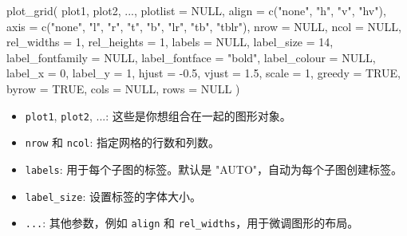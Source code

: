 \documentclass[
]{article}
\newenvironment{Shaded}{}{}
\newcommand{\AttributeTok}[1]{\textcolor[rgb]{0.49,0.56,0.16}{#1}}
\newcommand{\ConstantTok}[1]{\textcolor[rgb]{0.53,0.00,0.00}{#1}}
\newcommand{\DecValTok}[1]{\textcolor[rgb]{0.25,0.63,0.44}{#1}}
\newcommand{\FloatTok}[1]{\textcolor[rgb]{0.25,0.63,0.44}{#1}}
\newcommand{\FunctionTok}[1]{\textcolor[rgb]{0.02,0.16,0.49}{#1}}
\newcommand{\NormalTok}[1]{#1}
\newcommand{\SpecialCharTok}[1]{\textcolor[rgb]{0.25,0.44,0.63}{#1}}
\newcommand{\StringTok}[1]{\textcolor[rgb]{0.25,0.44,0.63}{#1}}
\begin{document}
\begin{Shaded}
\begin{Highlighting}[]
\FunctionTok{plot\_grid}\NormalTok{(}
\NormalTok{  plot1, plot2,}
\NormalTok{  ...,}
  \AttributeTok{plotlist =} \ConstantTok{NULL}\NormalTok{,}
  \AttributeTok{align =} \FunctionTok{c}\NormalTok{(}\StringTok{"none"}\NormalTok{, }\StringTok{"h"}\NormalTok{, }\StringTok{"v"}\NormalTok{, }\StringTok{"hv"}\NormalTok{),}
  \AttributeTok{axis =} \FunctionTok{c}\NormalTok{(}\StringTok{"none"}\NormalTok{, }\StringTok{"l"}\NormalTok{, }\StringTok{"r"}\NormalTok{, }\StringTok{"t"}\NormalTok{, }\StringTok{"b"}\NormalTok{, }\StringTok{"lr"}\NormalTok{, }\StringTok{"tb"}\NormalTok{, }\StringTok{"tblr"}\NormalTok{),}
  \AttributeTok{nrow =} \ConstantTok{NULL}\NormalTok{,}
  \AttributeTok{ncol =} \ConstantTok{NULL}\NormalTok{,}
  \AttributeTok{rel\_widths =} \DecValTok{1}\NormalTok{,}
  \AttributeTok{rel\_heights =} \DecValTok{1}\NormalTok{,}
  \AttributeTok{labels =} \ConstantTok{NULL}\NormalTok{,}
  \AttributeTok{label\_size =} \DecValTok{14}\NormalTok{,}
  \AttributeTok{label\_fontfamily =} \ConstantTok{NULL}\NormalTok{,}
  \AttributeTok{label\_fontface =} \StringTok{"bold"}\NormalTok{,}
  \AttributeTok{label\_colour =} \ConstantTok{NULL}\NormalTok{,}
  \AttributeTok{label\_x =} \DecValTok{0}\NormalTok{,}
  \AttributeTok{label\_y =} \DecValTok{1}\NormalTok{,}
  \AttributeTok{hjust =} \SpecialCharTok{{-}}\FloatTok{0.5}\NormalTok{,}
  \AttributeTok{vjust =} \FloatTok{1.5}\NormalTok{,}
  \AttributeTok{scale =} \DecValTok{1}\NormalTok{,}
  \AttributeTok{greedy =} \ConstantTok{TRUE}\NormalTok{,}
  \AttributeTok{byrow =} \ConstantTok{TRUE}\NormalTok{,}
  \AttributeTok{cols =} \ConstantTok{NULL}\NormalTok{,}
  \AttributeTok{rows =} \ConstantTok{NULL}
\NormalTok{)}
\end{Highlighting}
\end{Shaded}

\begin{itemize}
\item
  \texttt{plot1}, \texttt{plot2}, ...: 这些是你想组合在一起的图形对象。
\item
  \texttt{nrow} 和 \texttt{ncol}: 指定网格的行数和列数。
\item
  \texttt{labels}: 用于每个子图的标签。默认是
  "AUTO"，自动为每个子图创建标签。
\item
  \texttt{label\_size}: 设置标签的字体大小。
\item
  \texttt{...}: 其他参数，例如 \texttt{align} 和
  \texttt{rel\_widths}，用于微调图形的布局。
\end{itemize}
\end{document}
